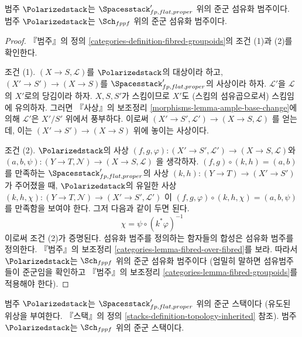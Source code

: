 \begin{lemma}
\label{lemma-polarized-fibred-in-groupoids}
범주 $\Polarizedstack$는 $\Spacesstack'_{fp, flat, proper}$ 위의 준군 섬유화
범주이다. 범주 $\Polarizedstack$는 $\Sch_{fppf}$ 위의 준군 섬유화 범주이다.
\end{lemma}

\begin{proof}
『범주』의 정의 \ref{categories-definition-fibred-groupoids}의 조건 (1)과
(2)를 확인한다.

\medskip\noindent
조건 (1). $(X \to S, \mathcal{L})$를 $\Polarizedstack$의 대상이라 하고,
$(X' \to S') \to (X \to S)$를 $\Spacesstack'_{fp, flat, proper}$의 사상이라
하자. $\mathcal{L}'$을 $\mathcal{L}$의 $X'$로의 당김이라 하자.
$X, S, S'$가 스킴이므로 $X'$도 (스킴의 섬유곱으로서) 스킴임에 유의하자.
그러면 『사상』의 보조정리 \ref{morphisms-lemma-ample-base-change}에 의해
$\mathcal{L}'$은 $X'/S'$ 위에서 풍부하다. 이로써
$(X' \to S', \mathcal{L}') \to (X \to S, \mathcal{L})$
를 얻는데, 이는 $(X' \to S') \to (X \to S)$ 위에 놓이는 사상이다.

\medskip\noindent
조건 (2). $\Polarizedstack$의 사상
$(f, g, \varphi) : (X' \to S', \mathcal{L}') \to (X \to S, \mathcal{L})$와
$(a, b, \psi) : (Y \to T, \mathcal{N}) \to (X \to S, \mathcal{L})$
을 생각하자. $(f, g) \circ (k, h) = (a, b)$를 만족하는
$\Spacesstack'_{fp, flat, proper}$의 사상
$(k, h) : (Y \to T) \to (X' \to S')$가 주어졌을 때,
$\Polarizedstack$의 유일한 사상
$(k, h, \chi) : (Y \to T, \mathcal{N}) \to (X' \to S', \mathcal{L}')$
이 $(f, g, \varphi) \circ (k, h, \chi) = (a, b, \psi)$를 만족함을 보여야 한다.
그저 다음과 같이 두면 된다.
$$
\chi = \psi \circ (k^*\varphi)^{-1}
$$
이로써 조건 (2)가 증명된다. 섬유화 범주를 정의하는 함자들의 합성은
섬유화 범주를 정의한다. 『범주』의 보조정리
\ref{categories-lemma-fibred-over-fibred}를 보라.
따라서 $\Polarizedstack$는 $\Sch_{fppf}$ 위의 준군 섬유화 범주이다
(엄밀히 말하면 섬유범주들이 준군임을 확인하고 『범주』의 보조정리
\ref{categories-lemma-fibred-groupoids}를 적용해야 한다).
\end{proof}

\begin{lemma}
\label{lemma-polarized-stack}
범주 $\Polarizedstack$는 $\Spacesstack'_{fp, flat, proper}$ 위의 준군 스택이다
(유도된 위상을 부여한다. 『스택』의 정의
\ref{stacks-definition-topology-inherited} 참조). 범주 $\Polarizedstack$는
$\Sch_{fppf}$ 위의 준군 스택이다.
\end{lemma}

